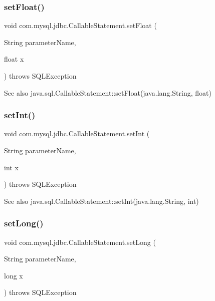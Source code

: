 \subsubsection{\texorpdfstring{set\+Float()}{setFloat()}}
{\footnotesize\ttfamily void com.\+mysql.\+jdbc.\+Callable\+Statement.\+set\+Float (\begin{DoxyParamCaption}\item[{String}]{parameter\+Name,  }\item[{float}]{x }\end{DoxyParamCaption}) throws S\+Q\+L\+Exception}

\begin{DoxySeeAlso}{See also}
java.\+sql.\+Callable\+Statement\+::set\+Float(java.\+lang.\+String, float) 
\end{DoxySeeAlso}
\mbox{\label{classcom_1_1mysql_1_1jdbc_1_1_callable_statement_abb91064a17230c178eed6e06cbe9981b}} 
\subsubsection{\texorpdfstring{set\+Int()}{setInt()}}
{\footnotesize\ttfamily void com.\+mysql.\+jdbc.\+Callable\+Statement.\+set\+Int (\begin{DoxyParamCaption}\item[{String}]{parameter\+Name,  }\item[{int}]{x }\end{DoxyParamCaption}) throws S\+Q\+L\+Exception}

\begin{DoxySeeAlso}{See also}
java.\+sql.\+Callable\+Statement\+::set\+Int(java.\+lang.\+String, int) 
\end{DoxySeeAlso}
\mbox{\label{classcom_1_1mysql_1_1jdbc_1_1_callable_statement_aedc4d1d0cebc116fe920a3625412a7dc}} 
\subsubsection{\texorpdfstring{set\+Long()}{setLong()}}
{\footnotesize\ttfamily void com.\+mysql.\+jdbc.\+Callable\+Statement.\+set\+Long (\begin{DoxyParamCaption}\item[{String}]{parameter\+Name,  }\item[{long}]{x }\end{DoxyParamCaption}) throws S\+Q\+L\+Exception}

